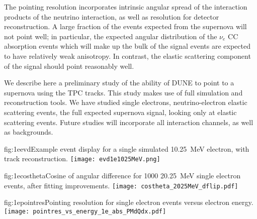 The pointing resolution incorporates intrinsic angular spread of the interaction products of the neutrino interaction, as well as resolution for detector reconstruction.  A large fraction of the events expected from the supernova will not point well; in particular, the expected angular distribution of the $\nu_e$ CC absorption events which will make up the bulk of the signal events are expected to have relatively weak anisotropy.  In contrast, the elastic scattering component of the signal should point reasonably well.

We describe here a preliminary study of the ability of DUNE to point to a
supernova using the TPC tracks.  This study makes use of full 
simulation and reconstruction tools.
We have studied single electrons, neutrino-electron elastic scattering
events, the full expected supernova signal, looking only at elastic
scattering events.  Future studies will incorporate all interaction
channels, as well as backgrounds.


\begin{dunefigure}[ES event]{fig:1eevd}{Example event display for a single simulated 10.25~MeV electron, with track reconstruction.}
 \texttt{[image: evd1e1025MeV.png]}
\end{dunefigure}

\begin{dunefigure}{fig:1ecostheta}{Cosine of
    angular difference for 1000 20.25~MeV single electron events,
    after fitting improvements.}
\texttt{[image: costheta\_2025MeV\_dflip.pdf]}
\end{dunefigure}



 \begin{dunefigure}{fig:1epointres}{Pointing resolution for single electron events versus electron energy.}
 \texttt{[image: pointres\_vs\_energy\_1e\_abs\_PMdQdx.pdf]}
 \end{dunefigure}


